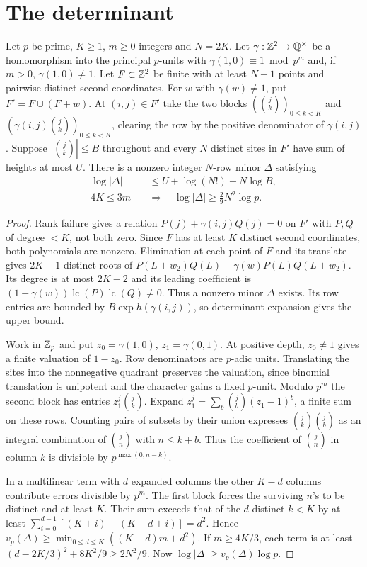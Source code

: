 \section{The determinant}\label{sec:determinant}
\begin{proposition}\label{lem:minor}
Let $p$ be prime, $K\ge1$, $m\ge0$ integers and $N=2K$. Let
$\gamma:\mathbb Z^2\to\mathbb Q^\times$ be a homomorphism into the principal $p$-units
with $\gamma(1,0)\equiv1\bmod p^m$ and, if $m>0$, $\gamma(1,0)\ne1$.
Let $F\subset\mathbb Z^2$ be finite with at least $N-1$ points and pairwise
distinct second coordinates. For $w$ with $\gamma(w)\ne1$, put
$F'=F\cup(F+w)$. At $(i,j)\in F'$ take the two blocks
$(\binom jk)_{0\le k<K}$ and $(\gamma(i,j)\binom jk)_{0\le k<K}$,
clearing the row by the positive denominator of $\gamma(i,j)$.
Suppose $|\binom jk|\le B$ throughout and every $N$ distinct sites in
$F'$ have sum of heights at most $U$. There is a nonzero integer
$N$-row minor $\Delta$ satisfying
\begin{equation}\label{eq:both}
 \begin{split}
 \log|\Delta|&\le U+\log(N!)+N\log B,\\
 4K\le3m\quad&\Longrightarrow\quad \log|\Delta|\ge\tfrac29 N^2\log p .
 \end{split}
\end{equation}
\end{proposition}
\begin{proof}
Rank failure gives a relation $P(j)+\gamma(i,j)Q(j)=0$ on $F'$ with
$P,Q$ of degree $<K$, not both zero. Since $F$ has at least $K$ distinct
second coordinates, both polynomials are nonzero. Elimination at each
point of $F$ and its translate gives $2K-1$ distinct roots of
$P(L+w_2)Q(L)-\gamma(w)P(L)Q(L+w_2)$. Its degree is at most $2K-2$ and
its leading coefficient is $(1-\gamma(w))\operatorname{lc}(P)\operatorname{lc}(Q)\ne0$.
Thus a nonzero minor $\Delta$ exists. Its row entries are bounded by
$B\exp h(\gamma(i,j))$, so determinant expansion gives the upper bound.

Work in $\mathbb Z_p$ and put $z_0=\gamma(1,0)$, $z_1=\gamma(0,1)$.
At positive depth, $z_0\ne1$ gives a finite valuation of $1-z_0$. Row denominators are
$p$-adic units. Translating the sites into the nonnegative quadrant
preserves the valuation, since binomial translation is unipotent and
the character gains a fixed $p$-unit. Modulo $p^m$ the second block has
entries $z_1^j\binom jk$. Expand $z_1^j=\sum_b\binom jb(z_1-1)^b$,
a finite sum on these rows. Counting pairs of subsets by their union
expresses $\binom jk\binom jb$ as an integral combination of
$\binom jn$ with $n\le k+b$. Thus the coefficient of $\binom jn$ in
column $k$ is divisible by $p^{\max(0,n-k)}$.

In a multilinear term with $d$ expanded columns the other $K-d$
columns contribute errors divisible by $p^m$. The first block forces
the surviving $n$'s to be distinct and at least $K$. Their sum exceeds
that of the $d$ distinct $k<K$ by at least
$\sum_{i=0}^{d-1}[(K+i)-(K-d+i)]=d^2$. Hence
$v_p(\Delta)\ge\min_{0\le d\le K}((K-d)m+d^2)$.
If $m\ge4K/3$, each term is at least
$(d-2K/3)^2+8K^2/9\ge2N^2/9$. Now $\log|\Delta|\ge v_p(\Delta)\log p$.
\end{proof}

